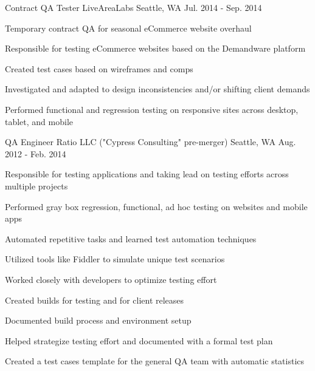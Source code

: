 \begin{cventries}
\cventry
  {Contract QA Tester} %
  {LiveAreaLabs} %
  {Seattle, WA} %
  {Jul. 2014 - Sep. 2014} %
  {
    \begin{cvitems} %
      \item[] {Temporary contract QA for seasonal eCommerce website overhaul}
      \item[]
      \item {Responsible for testing eCommerce websites based on the Demandware platform}
      \item {Created test cases based on wireframes and comps}
      \item {Investigated and adapted to design inconsistencies and/or shifting client demands}
      \item {Performed functional and regression testing on responsive sites across desktop, tablet, and mobile}
    \end{cvitems}
  }

\cventry
  {QA Engineer} %
  {Ratio LLC ("Cypress Consulting" pre-merger)} %
  {Seattle, WA} %
  {Aug. 2012 - Feb. 2014} %
  {
    \begin{cvitems} %
      \item[] {Responsible for testing applications and taking lead on testing efforts across multiple projects}
      \item[]
      \item {Performed gray box regression, functional, ad hoc testing on websites and mobile apps}
      \item {Automated repetitive tasks and learned test automation techniques}
      \item {Utilized tools like Fiddler to simulate unique test scenarios}
      \item {Worked closely with developers to optimize testing effort}
      \item {Created builds for testing and for client releases}
      \item {Documented build process and environment setup}
      \item {Helped strategize testing effort and documented with a formal test plan}
      \item {Created a test cases template for the general QA team with automatic statistics}
    \end{cvitems}
  }


\end{cventries}
